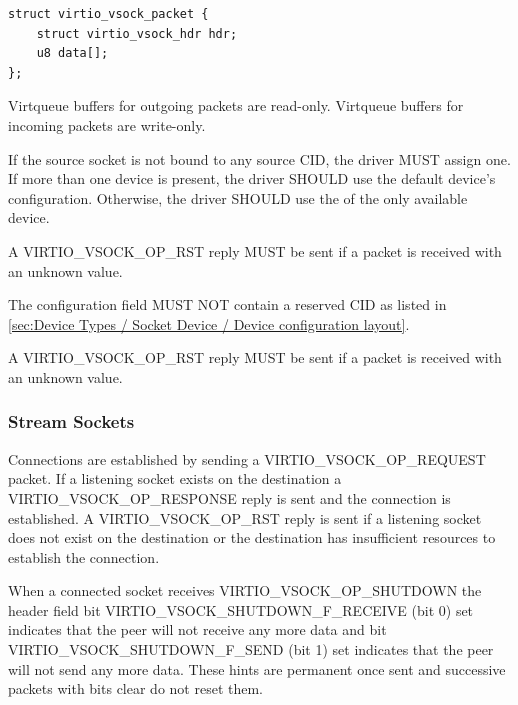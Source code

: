 \begin{lstlisting}
struct virtio_vsock_packet {
    struct virtio_vsock_hdr hdr;
    u8 data[];
};
\end{lstlisting}

Virtqueue buffers for outgoing packets are read-only. Virtqueue buffers for
incoming packets are write-only.


If the source socket is not bound to any source CID, the driver MUST assign
one. If more than one device is present, the driver SHOULD use the default
device's  configuration. Otherwise, the driver SHOULD use
the  of the only available device.

A VIRTIO_VSOCK_OP_RST reply MUST be sent if a packet is received with an
unknown  value.


The  configuration field MUST NOT contain a reserved CID as listed in \ref{sec:Device Types / Socket Device / Device configuration layout}.

A VIRTIO_VSOCK_OP_RST reply MUST be sent if a packet is received with an
unknown  value.

\subsubsection{Stream Sockets}\label{sec:Device Types / Socket Device / Device Operation / Stream Sockets}

Connections are established by sending a VIRTIO_VSOCK_OP_REQUEST packet. If a
listening socket exists on the destination a VIRTIO_VSOCK_OP_RESPONSE reply is
sent and the connection is established.  A VIRTIO_VSOCK_OP_RST reply is sent if
a listening socket does not exist on the destination or the destination has
insufficient resources to establish the connection.

When a connected socket receives VIRTIO_VSOCK_OP_SHUTDOWN the header
 field bit VIRTIO_VSOCK_SHUTDOWN_F_RECEIVE (bit 0) set indicates
that the peer will not receive any more data and bit VIRTIO_VSOCK_SHUTDOWN_F_SEND
(bit 1) set indicates that the peer will not send any more data.  These hints are
permanent once sent and successive packets with bits clear do not reset them.

